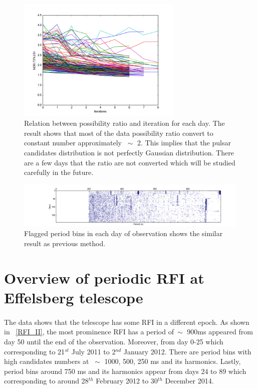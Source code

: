 \documentclass[thesis_msc.tex]{subfiles}
\begin{document}
\begin{figure}[h!] 
\centering
\includegraphics[width=0.7\textwidth]{figures/3sig.png}
\caption{Relation between possibility ratio and iteration for each day. The result shows that most of the data possibility ratio convert to constant number approximately $~\sim$ 2. This implies that the pulsar candidates distribution is not perfectly Gaussian distribution. There are a few days that the ratio are not converted which will be studied carefully in the future.}
\label{RFI_3sig}
\end{figure}

\begin{figure}[h!] 
\centering
\includegraphics[width=1.0\textwidth]{figures/method2.png}
\caption{Flagged period bins in each day of observation shows the similar result as previous method.}
\label{RFI_III}
\end{figure}
 
 \section{Overview of periodic RFI at Effelsberg telescope }
 \paragraph{} The data shows that the telescope has some RFI in a different epoch. As shown in ~\ref{RFI_II}, the most prominence RFI has a period of$~\sim$ 900ms appeared from day 50 until the end of the observation. Moreover, from day 0-25 which corresponding to 21$^{st}$  July 2011 to 2$^{nd}$  January 2012. There are period bins with high candidates numbers at $~\sim$ 1000, 500, 250 ms and its harmonics. Lastly, period bins around 750 ms and its harmonics appear from days 24 to 89 which corresponding to around 28$^{th}$ February 2012 to 30$^{th}$  December 2014.  
    
     
\end{document}
